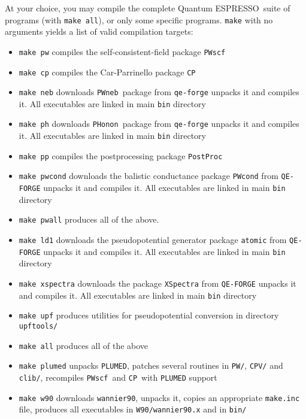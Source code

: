 \documentclass[12pt,a4paper]{article}
\def\qe{{\sc Quantum ESPRESSO}}
\def\PWscf{\texttt{PWscf}}
\def\PHonon{\texttt{PHonon}}
\def\CP{\texttt{CP}}
\def\PostProc{\texttt{PostProc}}
\def\NEB{\texttt{PWneb}} %
\begin{document}
At your choice, you may compile the complete \qe\ suite of programs
(with \texttt{make all}), or only some specific programs. \texttt{make} with no arguments yields a list of valid compilation targets:
\begin{itemize}
\item \texttt{make pw}  compiles the self-consistent-field package \PWscf
\item \texttt{make cp}  compiles the Car-Parrinello package \CP
\item \texttt{make neb} downloads \NEB\ package from \texttt{qe-forge}
			unpacks it and compiles it. All executables are linked
			in main \texttt{bin} directory
\item \texttt{make ph}  downloads \PHonon\ package from \texttt{qe-forge}
			unpacks it and compiles it. All executables are linked
			in main \texttt{bin} directory
\item \texttt{make pp}  compiles the postprocessing package \PostProc
\item \texttt{make pwcond} downloads the balistic conductance package \texttt{PWcond}
			from \texttt{QE-FORGE}
			unpacks it and compiles it. All executables are linked
			in main \texttt{bin} directory
\item \texttt{make pwall} produces all of the above.
\item \texttt{make ld1}  downloads the pseudopotential generator package \texttt{atomic}
			from \texttt{QE-FORGE}
			unpacks it and compiles it. All executables are linked
			in main \texttt{bin} directory
\item \texttt{make xspectra} downloads the package \texttt{XSpectra}
			from \texttt{QE-FORGE}
			unpacks it and compiles it. All executables are linked
			in main \texttt{bin} directory
\item \texttt{make upf} produces utilities for pseudopotential conversion in
                        directory \texttt{upftools/}
\item \texttt{make all} produces all of the above
\item \texttt{make plumed} unpacks \texttt{PLUMED}, patches several routines
                           in \texttt{PW/}, \texttt{CPV/} and \texttt{clib/},
                           recompiles \PWscf\ and \CP\ with \texttt{PLUMED}
                           support
\item \texttt{make w90} downloads \texttt{wannier90}, unpacks it, copies an appropriate
                       \texttt{make.inc} file,  produces all executables
                       in \texttt{W90/wannier90.x} and in \texttt{bin/}

\end{itemize}
\end{document}
